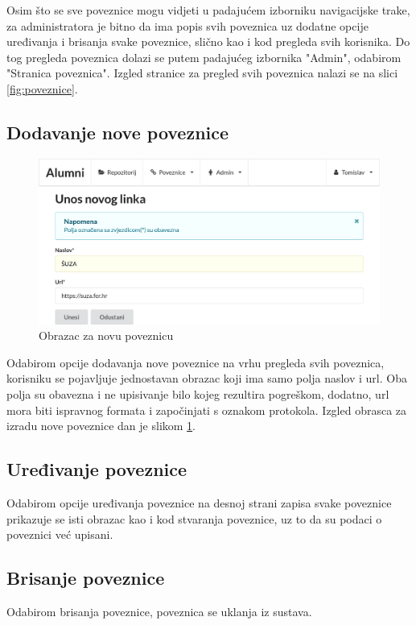 \documentclass[zavrsni, numeric]{fer}
\begin{document}
Osim što se sve poveznice mogu vidjeti u padajućem izborniku navigacijske trake, za administratora je bitno da ima popis svih poveznica uz dodatne opcije uređivanja i brisanja svake poveznice, slično kao i kod pregleda svih korisnika. Do tog pregleda poveznica dolazi se putem padajućeg izbornika "Admin", odabirom "Stranica poveznica". Izgled stranice za pregled svih poveznica nalazi se na slici \ref{fig:poveznice}.

\subsection{Dodavanje nove poveznice}

\begin{figure}[H]
	\centering
	\includegraphics[width=13cm]{slike/nova-poveznica.png}
	\caption{Obrazac za novu poveznicu}
	\label{fig:nova-poveznica}
\end{figure}

Odabirom opcije dodavanja nove poveznice na vrhu pregleda svih poveznica, korisniku se pojavljuje jednostavan obrazac koji ima samo polja naslov i url. Oba polja su obavezna i ne upisivanje bilo kojeg rezultira pogreškom, dodatno, url mora biti ispravnog formata i započinjati s oznakom protokola. Izgled obrasca za izradu nove poveznice dan je slikom \ref{fig:nova-poveznica}.

\subsection{Uređivanje poveznice}
Odabirom opcije uređivanja poveznice na desnoj strani zapisa svake poveznice prikazuje se isti obrazac kao i kod stvaranja poveznice, uz to da su podaci o poveznici već upisani. 

\subsection{Brisanje poveznice}
Odabirom brisanja poveznice, poveznica se uklanja iz sustava.
\end{document}

